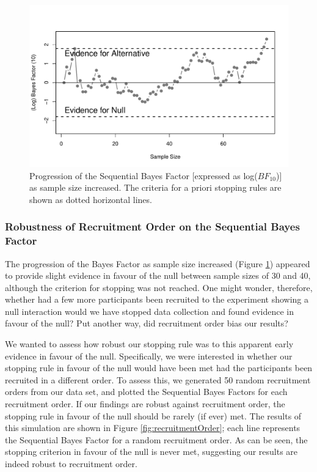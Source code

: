 \documentclass[a4paper, doc, natbib]{apa6}
\begin{document}
\begin{figure}
\begin{center}
\includegraphics[width = \textwidth]{Images/bayesFactor.pdf}
\caption{Progression of the Sequential Bayes Factor [expressed as log($BF_{10}$)] as sample size increased. The criteria for a priori stopping rules are shown as dotted horizontal lines.}
\label{fig:bayesFactor}
\end{center}
\end{figure}

\subsubsection{Robustness of Recruitment Order on the Sequential Bayes Factor}
The progression of the Bayes Factor as sample size increased (Figure \ref{fig:bayesFactor}) appeared to provide slight evidence in favour of the null between sample sizes of 30 and 40, although the criterion for stopping was not reached. One might wonder, therefore, whether had a few more participants been recruited to the experiment showing a null interaction would we have stopped data collection and found evidence in favour of the null? Put another way, did recruitment order bias our results?

We wanted to assess how robust our stopping rule was to this apparent early evidence in favour of the null. Specifically, we were interested in whether our stopping rule in favour of the null would have been met had the participants been recruited in a different order. To assess this, we generated 50 random recruitment orders from our data set, and plotted the Sequential Bayes Factors for each recruitment order. If our findings are robust against recruitment order, the stopping rule in favour of the null should be rarely (if ever) met.  The results of this simulation are shown in Figure \ref{fig:recruitmentOrder}; each line represents the Sequential Bayes Factor for a random recruitment order. As can be seen, the stopping criterion in favour of the null is never met, suggesting our results are indeed robust to recruitment order. 
\end{document}
